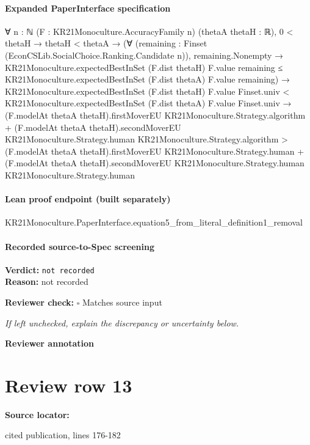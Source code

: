 \documentclass[10pt]{article}
\newcommand{\reviewerbox}{%
  \par\noindent\fbox{\parbox{0.96\linewidth}{\rule{0pt}{0.38in}}}\par
}
\newcommand{\reviewmatch}[1]{%
  \par\noindent\textbf{Reviewer check:} $\square$\; #1\par
  \noindent\emph{If left unchecked, explain the discrepancy or uncertainty below.}\par
}
\begin{document}
\paragraph{Expanded PaperInterface specification}
\begin{ReviewVerbatim}
∀ {n : ℕ} (F : KR21Monoculture.AccuracyFamily n) (thetaA thetaH : ℝ),
  0 < thetaH →
    thetaH < thetaA →
      (∀ (remaining : Finset (EconCSLib.SocialChoice.Ranking.Candidate n)),
          remaining.Nonempty →
            KR21Monoculture.expectedBestInSet (F.dist thetaH) F.value remaining ≤
              KR21Monoculture.expectedBestInSet (F.dist thetaA) F.value remaining) →
        KR21Monoculture.expectedBestInSet (F.dist thetaH) F.value Finset.univ <
            KR21Monoculture.expectedBestInSet (F.dist thetaA) F.value Finset.univ →
          (F.modelAt thetaA thetaH).firstMoverEU KR21Monoculture.Strategy.algorithm +
              (F.modelAt thetaA thetaH).secondMoverEU KR21Monoculture.Strategy.human
                KR21Monoculture.Strategy.algorithm >
            (F.modelAt thetaA thetaH).firstMoverEU KR21Monoculture.Strategy.human +
              (F.modelAt thetaA thetaH).secondMoverEU KR21Monoculture.Strategy.human KR21Monoculture.Strategy.human
\end{ReviewVerbatim}

\paragraph{Lean proof endpoint (built separately)}\begin{ReviewVerbatim}
KR21Monoculture.PaperInterface.equation5_from_literal_definition1_removal
\end{ReviewVerbatim}

\paragraph{Recorded source-to-Spec screening}
\textbf{Verdict:} \texttt{not recorded}
\\
\textbf{Reason:} not recorded
\reviewmatch{Matches source input}
\noindent\textbf{Reviewer annotation}\par
\reviewerbox
\clearpage
\hypertarget{source-claim-fa14b138c169a341}{}
\section*{Review row 13}
\textbf{Source locator:} {\footnotesize\raggedright cited publication, lines 176-\allowbreak{}182\par}
\end{document}
